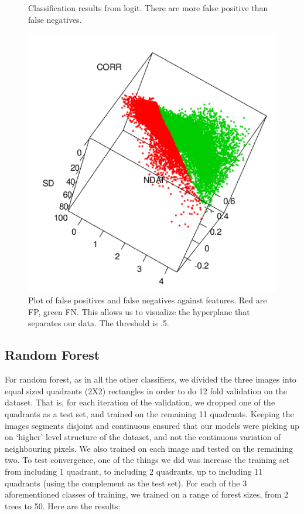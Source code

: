 \documentclass{article}\usepackage[]{graphicx}\usepackage[]{color}
\begin{document}
\begin{figure}
\caption{Classification results from logit. There are more false positive than false negatives.}
\end{figure}

\begin{center}
\begin{figure}
\includegraphics[scale = .5]{LogisticHyperplane.png}
\caption{Plot of false positives and false negatives against features. Red are FP, green FN. This allows us to visualize the hyperplane that separates our data. The threshold is .5.}
\end{figure}
\end{center}

\subsection{Random Forest}

For random forest, as in all the other classifiers, we divided the three images into equal sized quadrants (2X2) rectangles in order to do 12 fold validation on the dataset.  That is, for each iteration of the validation, we dropped one of the quadrants as a test set, and trained on the remaining 11 quadrants.  Keeping the images segments disjoint and continuous ensured that our models were picking up on `higher' level structure of the dataset, and not the continuous variation of neighbouring pixels.  We also trained on each image and tested on the remaining two.  To test convergence, one of the things we did was increase the training set from including 1 quadrant, to including 2 quadrants, up to including 11 quadrants (using the complement as the test set).  For each of the 3 aforementioned classes of training, we trained on a range of forest sizes, from 2 trees to 50.     Here are the results: 
\end{document}
